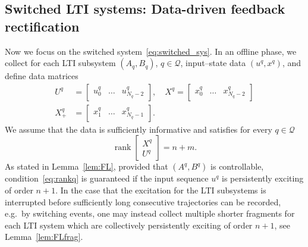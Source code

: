 \documentclass[11pt]{article}
\theoremstyle{plain}
\theoremstyle{definition}
\theoremstyle{remark}
\begin{document}
\subsection{Switched LTI systems: Data-driven feedback rectification}
\label{ssec:data_main}
Now we focus on the switched system~\eqref{eq:switched_sys}. In an offline phase, we collect for each LTI subsystem $(A_q,B_q)$, $q\in\mathcal Q$, input--state data $(u^q, x^q)$, and define data matrices
\begin{equation}
\label{eq:data_matq}
\begin{aligned}
    U^q &= \begin{bmatrix}
        u_0^q&\dots &u_{N_q-2}^q
    \end{bmatrix},\quad X^q = \begin{bmatrix}
        x_0^q & \dots & x_{N_q-2}^q
    \end{bmatrix}\\
    X_+^q &= \begin{bmatrix}
        x_1^q&\dots & x_{N_q-1}^q
    \end{bmatrix}.
\end{aligned}
\end{equation}
We assume that the data is sufficiently informative and satisfies for every $q\in\mathcal Q$
\begin{equation}
    \label{eq:rankq}
    \operatorname{rank}\begin{bmatrix}
        X^q\\ U^q
    \end{bmatrix} = n + m.
\end{equation}
As stated in Lemma~\ref{lem:FL}, provided that $(A^q,B^q)$ is controllable, condition~\eqref{eq:rankq} is guaranteed if the input sequence $u^q$ is persistently exciting of order $n+1$. In the case that the excitation for the LTI subsystems is interrupted before sufficiently long consecutive trajectories can be recorded, e.g.\ by switching events, one may instead collect multiple shorter fragments for each LTI system which are collectively persistently exciting of order $n+1$, see Lemma~\ref{lem:FLfrag}.
\end{document}
